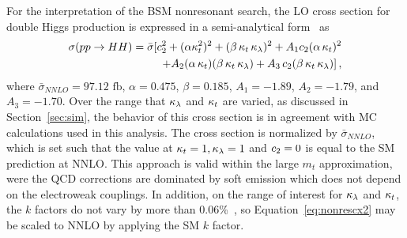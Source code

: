 For the interpretation of the BSM nonresonant search, the LO cross section for double Higgs production
is expressed in a semi-analytical form~\cite{Contino:2012xk} as
\begin{equation}
\begin{split}
\sigma (pp\to HH) = \bar{\sigma} [  c_2^2 + (\alpha \kappa_{t}^2)^2 +  (\beta\, \kappa_{t} \,\kappa_{\lambda})^2 + A_1 c_2 (\alpha\, \kappa_{t})^2 \\
 + A_2 (\alpha\, \kappa_{t}) (\beta\, \kappa_{t}\, \kappa_{\lambda}) + A_3\, c_2 (\beta\, \kappa_{t}\, \kappa_{\lambda}) ] \,,
\end{split}
\label{eq:nonrescx2}
\end{equation}
where $\bar{\sigma}_{NNLO} = 97.12 \mbox{ fb}$, $\alpha = 0.475$, $\beta = 0.185$, $A_1 = -1.89$,
$A_2 = -1.79$, and $A_3 = -1.70$.
Over the range that $\kappa_{\lambda}$ and $\kappa_{t}$ are varied, as discussed in Section~\ref{sec:sim},
the behavior of this cross section is in agreement with MC calculations used in this analysis.
The cross section is normalized by $\bar{\sigma}_{NNLO}$, which is set such that the value
at $\kappa_{t} = 1, \kappa_{\lambda} = 1$ and $c_2 = 0$ is equal to the SM prediction at NNLO.
This approach is valid within the large $m_t$ approximation, were the QCD corrections are dominated
by soft emission which does not depend on the electroweak couplings.
In addition, on the range of interest for $\kappa_{\lambda}$ and $\kappa_{t}$, the $k$ factors do not vary by
more than 0.06\%~\cite{deFlorian:2013jea}, so Equation~\ref{eq:nonrescx2} may be scaled to NNLO
by applying the SM $k$ factor.

%  

